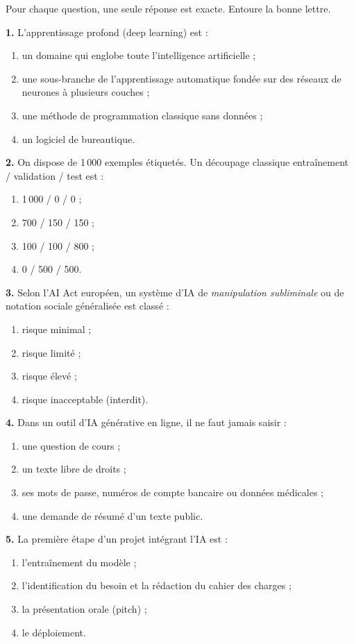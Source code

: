 \documentclass[11pt]{article}
\begin{document}
\begin{exercice}
Pour chaque question, une seule réponse est exacte. Entoure la bonne lettre.

\textbf{1.} L'apprentissage profond (deep learning) est :
\begin{enumerate}[label=\alph*)]
\item un domaine qui englobe toute l'intelligence artificielle ;
\item une sous-branche de l'apprentissage automatique fondée sur des réseaux de neurones à plusieurs couches ;
\item une méthode de programmation classique sans données ;
\item un logiciel de bureautique.
\end{enumerate}

\textbf{2.} On dispose de 1\,000 exemples étiquetés. Un découpage classique entraînement / validation / test est :
\begin{enumerate}[label=\alph*)]
\item 1\,000 / 0 / 0 ;
\item 700 / 150 / 150 ;
\item 100 / 100 / 800 ;
\item 0 / 500 / 500.
\end{enumerate}

\textbf{3.} Selon l'AI Act européen, un système d'IA de \emph{manipulation subliminale} ou de notation sociale généralisée est classé :
\begin{enumerate}[label=\alph*)]
\item risque minimal ; \item risque limité ; \item risque élevé ; \item risque inacceptable (interdit).
\end{enumerate}

\textbf{4.} Dans un outil d'IA générative en ligne, il ne faut jamais saisir :
\begin{enumerate}[label=\alph*)]
\item une question de cours ;
\item un texte libre de droits ;
\item ses mots de passe, numéros de compte bancaire ou données médicales ;
\item une demande de résumé d'un texte public.
\end{enumerate}

\textbf{5.} La première étape d'un projet intégrant l'IA est :
\begin{enumerate}[label=\alph*)]
\item l'entraînement du modèle ;
\item l'identification du besoin et la rédaction du cahier des charges ;
\item la présentation orale (pitch) ;
\item le déploiement.
\end{enumerate}
\end{exercice}
\end{document}

